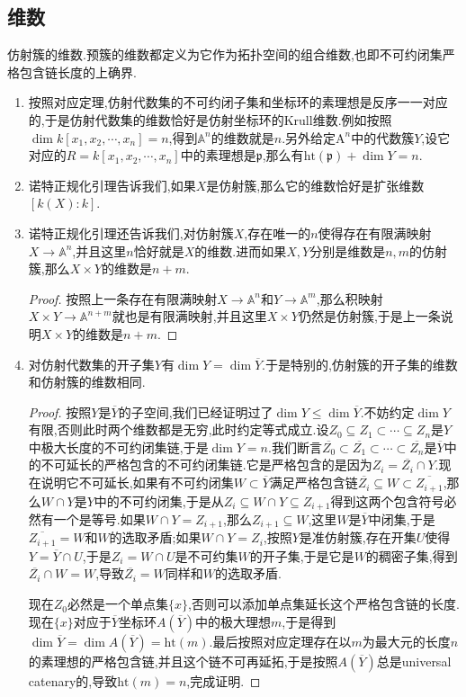 \subsection{维数}

仿射簇的维数.预簇的维数都定义为它作为拓扑空间的组合维数,也即不可约闭集严格包含链长度的上确界.
\begin{enumerate}
	\item 按照对应定理,仿射代数集的不可约闭子集和坐标环的素理想是反序一一对应的,于是仿射代数集的维数恰好是仿射坐标环的Krull维数.例如按照$\dim k[x_1,x_2,\cdots,x_n]=n$,得到$\mathbb{A}^n$的维数就是$n$.另外给定$\mathrm{A}^n$中的代数簇$Y$,设它对应的$R=k[x_1,x_2,\cdots,x_n]$中的素理想是$\mathfrak{p}$,那么有$\mathrm{ht}(\mathfrak{p})+\dim Y=n$.
	\item 诺特正规化引理告诉我们,如果$X$是仿射簇,那么它的维数恰好是扩张维数$[k(X):k]$.
	\item 诺特正规化引理还告诉我们,对仿射簇$X$,存在唯一的$n$使得存在有限满映射$X\to\mathbb{A}^n$,并且这里$n$恰好就是$X$的维数.进而如果$X,Y$分别是维数是$n,m$的仿射簇,那么$X\times Y$的维数是$n+m$.
	\begin{proof}
		
		按照上一条存在有限满映射$X\to\mathbb{A}^n$和$Y\to\mathbb{A}^m$,那么积映射$X\times Y\to\mathbb{A}^{n+m}$就也是有限满映射,并且这里$X\times Y$仍然是仿射簇,于是上一条说明$X\times Y$的维数是$n+m$.
	\end{proof}
	\item 对仿射代数集的开子集$Y$有$\dim Y=\dim\overline{Y}$.于是特别的,仿射簇的开子集的维数和仿射簇的维数相同.
	\begin{proof}
		
		按照$Y$是$\overline{Y}$的子空间,我们已经证明过了$\dim Y\le\dim\overline{Y}$.不妨约定$\dim Y$有限,否则此时两个维数都是无穷,此时约定等式成立.设$Z_0\subseteq Z_1\subset\cdots\subseteq Z_n$是$Y$中极大长度的不可约闭集链,于是$\dim Y=n$.我们断言$\overline{Z_0}\subset\overline{Z_1}\subset\cdots\subset\overline{Z_n}$是$\overline{Y}$中的不可延长的严格包含的不可约闭集链.它是严格包含的是因为$Z_i=\overline{Z_i}\cap Y$.现在说明它不可延长,如果有不可约闭集$W\subset\overline{Y}$满足严格包含链$\overline{Z_i}\subseteq W\subset\overline{Z_{i+1}}$,那么$W\cap Y$是$Y$中的不可约闭集,于是从$Z_i\subseteq W\cap Y\subseteq Z_{i+1}$得到这两个包含符号必然有一个是等号.如果$W\cap Y=Z_{i+1}$,那么$Z_{i+1}\subseteq W$,这里$W$是$\overline{Y}$中闭集,于是$\overline{Z_{i+1}}=W$和$W$的选取矛盾;如果$W\cap Y=Z_i$,按照$Y$是准仿射簇,存在开集$U$使得$Y=\overline{Y}\cap U$,于是$Z_i=W\cap U$是不可约集$W$的开子集,于是它是$W$的稠密子集,得到$\overline{Z_i}\cap W=W$,导致$\overline{Z_i}=W$同样和$W$的选取矛盾.
		
		\qquad
		
		现在$Z_0$必然是一个单点集$\{x\}$,否则可以添加单点集延长这个严格包含链的长度.现在$\{x\}$对应于$\overline{Y}$坐标环$A(\overline{Y})$中的极大理想$m$,于是得到$\dim\overline{Y}=\dim A(\overline{Y})=\mathrm{ht}(m)$.最后按照对应定理存在以$m$为最大元的长度$n$的素理想的严格包含链,并且这个链不可再延拓,于是按照$A(\overline{Y})$总是universal catenary的,导致$\mathrm{ht}(m)=n$,完成证明.
	\end{proof}
\end{enumerate}

